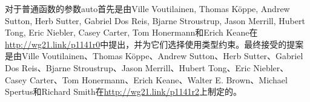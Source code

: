 

对于普通函数的参数auto首先是由Ville Voutilainen, Thomas Köppe, Andrew Sutton, Herb Sutter, Gabriel Dos Reis, Bjarne Stroustrup, Jason Merrill, Hubert Tong, Eric Niebler, Casey Carter, Tom Honermann和Erich Keane在\url{http://wg21.link/p1141r0}中提出，并为它们选择使用类型约束。最终接受的提案是由Ville Voutilainen、Thomas Köppe、Andrew Sutton、Herb Sutter、Gabriel Dos Reis、Bjarne Stroustrup、Jason Merrill、Hubert Tong、Eric Niebler、Casey Carter、Tom Honermann、Erich Keane、Walter E. Brown、Michael Spertus和Richard Smith在\url{http://wg21.link/p1141r2}上制定的。